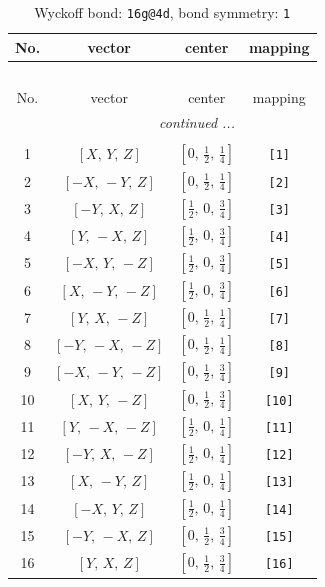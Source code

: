 \documentclass[fleqn,8pt]{jsarticle}
\begin{document}
\begin{longtable}{cccc}
\caption{Wyckoff bond: {\tt 16g@4d}, bond symmetry: {\tt 1}}
 \\
 \hline \hline
No. & vector & center & mapping \\ \hline \endfirsthead

\multicolumn{3}{l}{\tablename\ \thetable{}} \\
 \hline \hline
No. & vector & center & mapping \\ \hline \endhead

 \hline \hline
\multicolumn{3}{r}{\footnotesize\it continued ...} \\ \endfoot

 \hline \hline
\multicolumn{3}{r}{} \\ \endlastfoot

1 & $\left[ X,\, Y,\, Z \right]$ & $\left[ 0,\, \frac{1}{2},\, \frac{1}{4} \right]$ & {\tt [1]} \\ \hline
2 & $\left[ - X,\, - Y,\, Z \right]$ & $\left[ 0,\, \frac{1}{2},\, \frac{1}{4} \right]$ & {\tt [2]} \\ \hline
3 & $\left[ - Y,\, X,\, Z \right]$ & $\left[ \frac{1}{2},\, 0,\, \frac{3}{4} \right]$ & {\tt [3]} \\ \hline
4 & $\left[ Y,\, - X,\, Z \right]$ & $\left[ \frac{1}{2},\, 0,\, \frac{3}{4} \right]$ & {\tt [4]} \\ \hline
5 & $\left[ - X,\, Y,\, - Z \right]$ & $\left[ \frac{1}{2},\, 0,\, \frac{3}{4} \right]$ & {\tt [5]} \\ \hline
6 & $\left[ X,\, - Y,\, - Z \right]$ & $\left[ \frac{1}{2},\, 0,\, \frac{3}{4} \right]$ & {\tt [6]} \\ \hline
7 & $\left[ Y,\, X,\, - Z \right]$ & $\left[ 0,\, \frac{1}{2},\, \frac{1}{4} \right]$ & {\tt [7]} \\ \hline
8 & $\left[ - Y,\, - X,\, - Z \right]$ & $\left[ 0,\, \frac{1}{2},\, \frac{1}{4} \right]$ & {\tt [8]} \\ \hline
9 & $\left[ - X,\, - Y,\, - Z \right]$ & $\left[ 0,\, \frac{1}{2},\, \frac{3}{4} \right]$ & {\tt [9]} \\ \hline
10 & $\left[ X,\, Y,\, - Z \right]$ & $\left[ 0,\, \frac{1}{2},\, \frac{3}{4} \right]$ & {\tt [10]} \\ \hline
11 & $\left[ Y,\, - X,\, - Z \right]$ & $\left[ \frac{1}{2},\, 0,\, \frac{1}{4} \right]$ & {\tt [11]} \\ \hline
12 & $\left[ - Y,\, X,\, - Z \right]$ & $\left[ \frac{1}{2},\, 0,\, \frac{1}{4} \right]$ & {\tt [12]} \\ \hline
13 & $\left[ X,\, - Y,\, Z \right]$ & $\left[ \frac{1}{2},\, 0,\, \frac{1}{4} \right]$ & {\tt [13]} \\ \hline
14 & $\left[ - X,\, Y,\, Z \right]$ & $\left[ \frac{1}{2},\, 0,\, \frac{1}{4} \right]$ & {\tt [14]} \\ \hline
15 & $\left[ - Y,\, - X,\, Z \right]$ & $\left[ 0,\, \frac{1}{2},\, \frac{3}{4} \right]$ & {\tt [15]} \\ \hline
16 & $\left[ Y,\, X,\, Z \right]$ & $\left[ 0,\, \frac{1}{2},\, \frac{3}{4} \right]$ & {\tt [16]} \\
\end{longtable}
\end{document}
